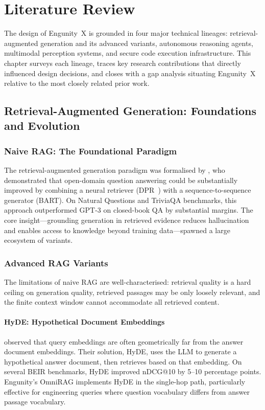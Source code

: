 \chapter{Literature Review}
\label{chap:litrev}

The design of Engunity~X is grounded in four major technical lineages: retrieval-augmented generation and its advanced variants, autonomous reasoning agents, multimodal perception systems, and secure code execution infrastructure. This chapter surveys each lineage, traces key research contributions that directly influenced design decisions, and closes with a gap analysis situating Engunity~X relative to the most closely related prior work.

\section{Retrieval-Augmented Generation: Foundations and Evolution}
\label{sec:rag-survey}

\subsection{Naive RAG: The Foundational Paradigm}
\label{subsec:naive-rag}

The retrieval-augmented generation paradigm was formalised by \citet{lewis2020rag}, who demonstrated that open-domain question answering could be substantially improved by combining a neural retriever (DPR~\citep{karpukhin2020dpr}) with a sequence-to-sequence generator (BART). On Natural Questions and TriviaQA benchmarks, this approach outperformed GPT-3 on closed-book QA by substantial margins. The core insight---grounding generation in retrieved evidence reduces hallucination and enables access to knowledge beyond training data---spawned a large ecosystem of variants.

\subsection{Advanced RAG Variants}
\label{subsec:advanced-rag}

The limitations of naive RAG are well-characterised: retrieval quality is a hard ceiling on generation quality, retrieved passages may be only loosely relevant, and the finite context window cannot accommodate all retrieved content.

\subsubsection{HyDE: Hypothetical Document Embeddings}
\citet{gao2022precise} observed that query embeddings are often geometrically far from the answer document embeddings. Their solution, HyDE, uses the LLM to generate a hypothetical answer document, then retrieves based on that embedding. On several BEIR benchmarks, HyDE improved nDCG@10 by 5--10 percentage points. Engunity's OmniRAG implements HyDE in the single-hop path, particularly effective for engineering queries where question vocabulary differs from answer passage vocabulary.

